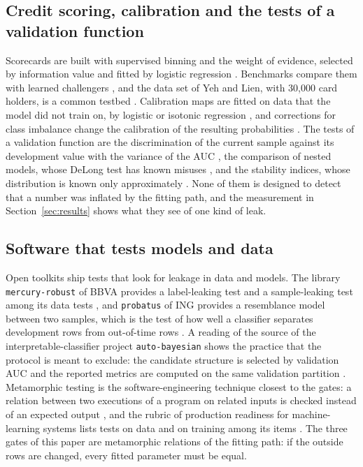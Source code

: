 \subsection{Credit scoring, calibration and the tests of a validation function}

Scorecards are built with supervised binning and the weight of evidence, selected by information value and fitted by logistic regression \citep{siddiqi2017,thomas2002,hand1997,navas2020}. Benchmarks compare them with learned challengers \citep{baesens2003,lessmann2015,gunnarsson2021}, and the data set of Yeh and Lien, with 30,000 card holders, is a common testbed \citep{yeh2009}. Calibration maps are fitted on data that the model did not train on, by logistic or isotonic regression \citep{niculescu2005,zadrozny2002}, and corrections for class imbalance change the calibration of the resulting probabilities \citep{goorbergh2022}. The tests of a validation function are the discrimination of the current sample against its development value with the variance of the AUC \citep{hanley1982,delong1988,ecb2019,bcbs14}, the comparison of nested models, whose DeLong test has known misuses \citep{demler2012}, and the stability indices, whose distribution is known only approximately \citep{yurdakul2020}. None of them is designed to detect that a number was inflated by the fitting path, and the measurement in Section~\ref{sec:results} shows what they see of one kind of leak.

\subsection{Software that tests models and data}

Open toolkits ship tests that look for leakage in data and models. The library \texttt{mercury-robust} of BBVA provides a label-leaking test and a sample-leaking test among its data tests \citep{mercury2023}, and \texttt{probatus} of ING provides a resemblance model between two samples, which is the test of how well a classifier separates development rows from out-of-time rows \citep{probatus2026}. A reading of the source of the interpretable-classifier project \texttt{auto-bayesian} shows the practice that the protocol is meant to exclude: the candidate structure is selected by validation AUC and the reported metrics are computed on the same validation partition \citep{autobayesian2026}. Metamorphic testing is the software-engineering technique closest to the gates: a relation between two executions of a program on related inputs is checked instead of an expected output \citep{chen2018,segura2016}, and the rubric of production readiness for machine-learning systems lists tests on data and on training among its items \citep{breck2017}. The three gates of this paper are metamorphic relations of the fitting path: if the outside rows are changed, every fitted parameter must be equal.

